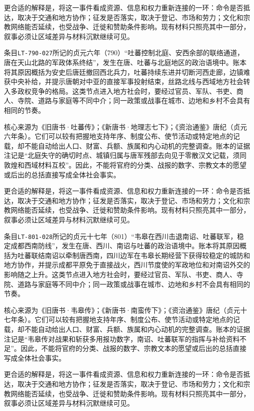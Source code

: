 更合适的解释是，将这一事件看成资源、信息和权力重新连接的一环：命令是否抵达，取决于交通和地方协作；征发是否落实，取决于登记、市场和劳力；文化和宗教网络能否延续，也受战争、迁徙和赞助条件影响。现有材料只照亮其中一部分，叙事必须让区域差异与材料沉默继续可见。

条目\texttt{LT-790-027}所记的贞元六年（790）“吐蕃控制北庭、安西余部的联络通道，唐在天山北路的军政体系终结”，发生在唐、吐蕃与北庭地区的政治语境中。账本将其原因概括为安史后唐廷撤回西北兵力，吐蕃持续东进并切断河西走廊，边镇难获中央补给，并提示唐朝对中亚的直接军事投射结束，丝路北线与西域地方社会转入多政权竞争的格局。这类节点进入地方社会时，要经过官员、军队、书吏、商人、寺院、道路与家庭等不同中介；同一政策或战事在城市、边地和乡村不会具有相同的节奏。

核心来源为《旧唐书·吐蕃传》；《新唐书·地理志七下》；《资治通鉴》唐纪（贞元六年条）。它们可以较有把握地支持年序、制度公布、使节活动或特定地点的记载，却不能自动给出人口、财富、兵额、族属和内心动机的完整调查。账本的证据注记是“北庭失守的确切时点、城镇归属与唐军残部去向见于零散汉文记载，须同敦煌和西域材料互校”。因此，不能将官府的分类、战报的数字、宗教文本的愿望或后出的总括直接写成全体社会事实。

更合适的解释是，将这一事件看成资源、信息和权力重新连接的一环：命令是否抵达，取决于交通和地方协作；征发是否落实，取决于登记、市场和劳力；文化和宗教网络能否延续，也受战争、迁徙和赞助条件影响。现有材料只照亮其中一部分，叙事必须让区域差异与材料沉默继续可见。

条目\texttt{LT-801-028}所记的贞元十七年（801）“韦皋在西川击退南诏、吐蕃联军，稳定成都西南防线”，发生在唐、西川、南诏与吐蕃的政治语境中。账本将其原因概括为吐蕃联结南诏以牵制唐西南，四川边军在韦皋长期经营下获得较稳定的城防和地方协作，并提示成都平原免于直接战火，西川节度使的军政地位和对南诏外交的影响随之上升。这类节点进入地方社会时，要经过官员、军队、书吏、商人、寺院、道路与家庭等不同中介；同一政策或战事在城市、边地和乡村不会具有相同的节奏。

核心来源为《旧唐书·韦皋传》；《新唐书·南蛮传下》；《资治通鉴》唐纪（贞元十七年条）。它们可以较有把握地支持年序、制度公布、使节活动或特定地点的记载，却不能自动给出人口、财富、兵额、族属和内心动机的完整调查。账本的证据注记是“韦皋传对战果和斩获多用报功数字，南诏、吐蕃联军的指挥与补给资料不足”。因此，不能将官府的分类、战报的数字、宗教文本的愿望或后出的总括直接写成全体社会事实。

更合适的解释是，将这一事件看成资源、信息和权力重新连接的一环：命令是否抵达，取决于交通和地方协作；征发是否落实，取决于登记、市场和劳力；文化和宗教网络能否延续，也受战争、迁徙和赞助条件影响。现有材料只照亮其中一部分，叙事必须让区域差异与材料沉默继续可见。

